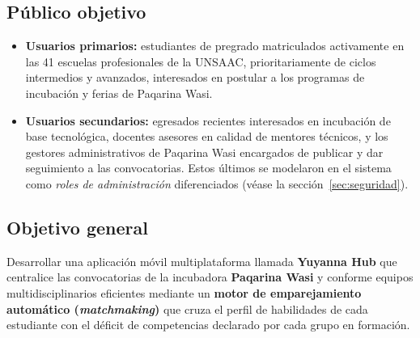 \documentclass[12pt,a4paper]{article}
\begin{document}
\subsection{Público objetivo}
\begin{itemize}
    \item \textbf{Usuarios primarios:} estudiantes de pregrado matriculados activamente en las 41 escuelas profesionales de la UNSAAC, prioritariamente de ciclos intermedios y avanzados, interesados en postular a los programas de incubación y ferias de Paqarina Wasi.
    \item \textbf{Usuarios secundarios:} egresados recientes interesados en incubación de base tecnológica, docentes asesores en calidad de mentores técnicos, y los gestores administrativos de Paqarina Wasi encargados de publicar y dar seguimiento a las convocatorias. Estos últimos se modelaron en el sistema como \emph{roles de administración} diferenciados (véase la sección~\ref{sec:seguridad}).
\end{itemize}

\subsection{Objetivo general}
Desarrollar una aplicación móvil multiplataforma llamada \textbf{Yuyanna Hub} que centralice las convocatorias de la incubadora \textbf{Paqarina Wasi} y conforme equipos multidisciplinarios eficientes mediante un \textbf{motor de emparejamiento automático (\emph{matchmaking})} que cruza el perfil de habilidades de cada estudiante con el déficit de competencias declarado por cada grupo en formación.
\end{document}
